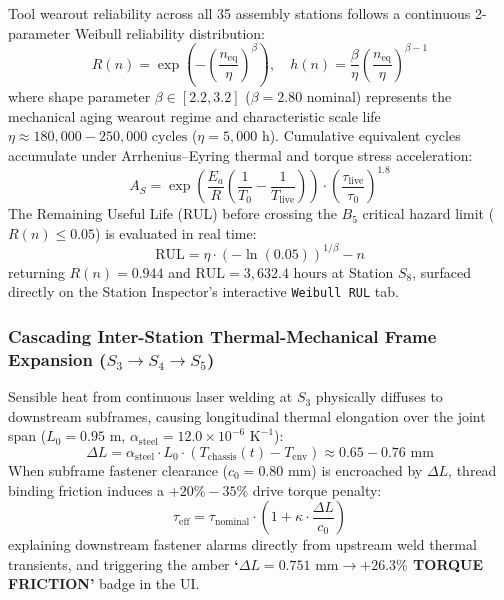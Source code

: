 \documentclass[11pt]{article}
\begin{document}
Tool wearout reliability across all 35 assembly stations follows a continuous 2-parameter Weibull reliability distribution:
\begin{equation}
R(n) = \exp\left(-\left(\frac{n_{\text{eq}}}{\eta}\right)^\beta\right), \quad h(n) = \frac{\beta}{\eta}\left(\frac{n_{\text{eq}}}{\eta}\right)^{\beta-1}
\end{equation}
where shape parameter $\beta \in [2.2, 3.2]$ ($\beta = 2.80$ nominal) represents the mechanical aging wearout regime and characteristic scale life $\eta \approx 180{,}000 - 250{,}000\text{ cycles}$ ($\eta = 5{,}000\text{ h}$). Cumulative equivalent cycles accumulate under Arrhenius--Eyring thermal and torque stress acceleration:
\begin{equation}
A_S = \exp\left(\frac{E_a}{R}\left(\frac{1}{T_0} - \frac{1}{T_{\text{live}}}\right)\right) \cdot \left(\frac{\tau_{\text{live}}}{\tau_0}\right)^{1.8}
\end{equation}
The Remaining Useful Life (RUL) before crossing the $B_5$ critical hazard limit ($R(n) \le 0.05$) is evaluated in real time:
\begin{equation}
\text{RUL} = \eta \cdot \left(-\ln(0.05)\right)^{1/\beta} - n
\end{equation}
returning $R(n) = 0.944$ and $\text{RUL} = 3{,}632.4\text{ hours}$ at Station $S_8$, surfaced directly on the Station Inspector's interactive \texttt{Weibull RUL} tab.

\subsubsection{Cascading Inter-Station Thermal-Mechanical Frame Expansion ($S_3 \to S_4 \to S_5$)}

Sensible heat from continuous laser welding at $S_3$ physically diffuses to downstream subframes, causing longitudinal thermal elongation over the joint span ($L_0 = 0.95\text{ m}$, $\alpha_{\text{steel}} = 12.0 \times 10^{-6}\text{ K}^{-1}$):
\begin{equation}
\Delta L = \alpha_{\text{steel}} \cdot L_0 \cdot \left(T_{\text{chassis}}(t) - T_{\text{env}}\right) \approx 0.65 - 0.76\text{ mm}
\end{equation}
When subframe fastener clearance ($c_0 = 0.80\text{ mm}$) is encroached by $\Delta L$, thread binding friction induces a $+20\% - 35\%$ drive torque penalty:
\begin{equation}
\tau_{\text{eff}} = \tau_{\text{nominal}} \cdot \left(1 + \kappa \cdot \frac{\Delta L}{c_0}\right)
\end{equation}
explaining downstream fastener alarms directly from upstream weld thermal transients, and triggering the amber \textbf{`$\Delta L = 0.751\text{ mm} \to +26.3\%$ TORQUE FRICTION'} badge in the UI.
\end{document}
